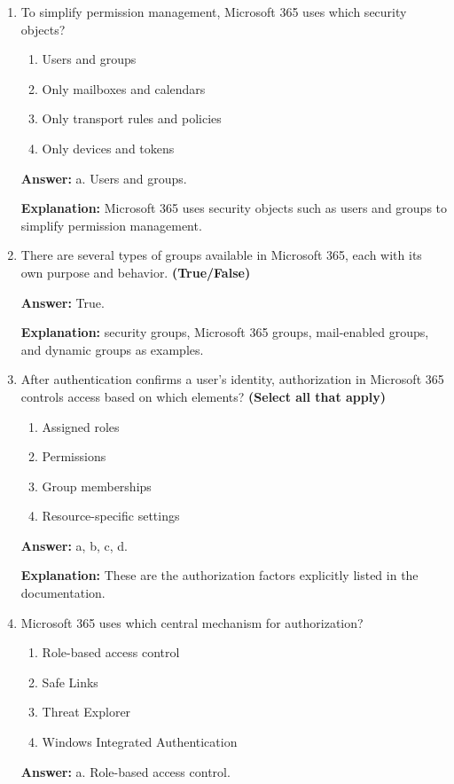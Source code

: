 \documentclass[10pt]{article}
\begin{document}
\begin{enumerate}[leftmargin=*]
\item To simplify permission management, Microsoft 365 uses which security objects?
\begin{enumerate}[label=\alph*., leftmargin=1.5em]
\item Users and groups
\item Only mailboxes and calendars
\item Only transport rules and policies
\item Only devices and tokens
\end{enumerate}
\textbf{Answer:} a. Users and groups.

\textbf{Explanation:} Microsoft 365 uses security objects such as users and groups to simplify permission management.

\item There are several types of groups available in Microsoft 365, each with its own purpose and behavior. \textbf{(True/False)}

\textbf{Answer:} True.

\textbf{Explanation:} security groups, Microsoft 365 groups, mail-enabled groups, and dynamic groups as examples.

\item After authentication confirms a user’s identity, authorization in Microsoft 365 controls access based on which elements? \textbf{(Select all that apply)}
\begin{enumerate}[label=\alph*., leftmargin=1.5em]
\item Assigned roles
\item Permissions
\item Group memberships
\item Resource-specific settings
\end{enumerate}
\textbf{Answer:} a, b, c, d.

\textbf{Explanation:} These are the authorization factors explicitly listed in the documentation.

\item Microsoft 365 uses which central mechanism for authorization?
\begin{enumerate}[label=\alph*., leftmargin=1.5em]
\item Role-based access control
\item Safe Links
\item Threat Explorer
\item Windows Integrated Authentication
\end{enumerate}
\textbf{Answer:} a. Role-based access control.


\end{enumerate}
\end{document}
